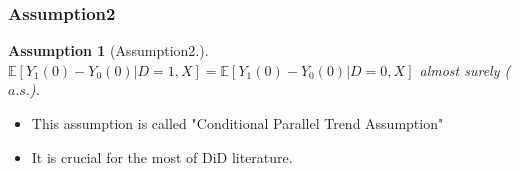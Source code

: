 \documentclass{beamer}
\newtheorem{assumption}[thm]{Assumption}
\begin{document}
\begin{frame}\frametitle{Assumption2}
    \begin{assumption}[Assumption2.]
        $\mathbb{E}[Y_{1}(0) - Y_{0}(0)| D = 1, X] = \mathbb{E}[Y_{1}(0) - Y_{0}(0)|D = 0, X]$ almost surely ($a.s.$).
    \end{assumption}
    \begin{itemize}
        \item This assumption is called "Conditional Parallel Trend Assumption"
        \item It is crucial for the most of DiD literature.
    \end{itemize}
\end{frame}
\end{document}
